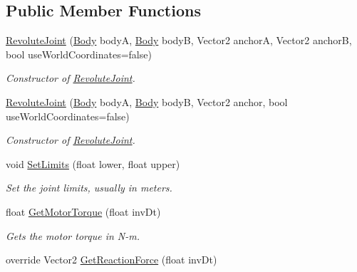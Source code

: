 \subsection*{Public Member Functions}
\begin{DoxyCompactItemize}
\item 
\hyperlink{class_farseer_physics_1_1_dynamics_1_1_joints_1_1_revolute_joint_a4f52ce45a6f14031f59de7c1bd7d6b66}{Revolute\+Joint} (\hyperlink{class_farseer_physics_1_1_dynamics_1_1_body}{Body} body\+A, \hyperlink{class_farseer_physics_1_1_dynamics_1_1_body}{Body} body\+B, Vector2 anchor\+A, Vector2 anchor\+B, bool use\+World\+Coordinates=false)
\begin{DoxyCompactList}\small\item\em Constructor of \hyperlink{class_farseer_physics_1_1_dynamics_1_1_joints_1_1_revolute_joint}{Revolute\+Joint}. \end{DoxyCompactList}\item 
\hyperlink{class_farseer_physics_1_1_dynamics_1_1_joints_1_1_revolute_joint_aa660255e4189a7669bf6d22c036af6f1}{Revolute\+Joint} (\hyperlink{class_farseer_physics_1_1_dynamics_1_1_body}{Body} body\+A, \hyperlink{class_farseer_physics_1_1_dynamics_1_1_body}{Body} body\+B, Vector2 anchor, bool use\+World\+Coordinates=false)
\begin{DoxyCompactList}\small\item\em Constructor of \hyperlink{class_farseer_physics_1_1_dynamics_1_1_joints_1_1_revolute_joint}{Revolute\+Joint}. \end{DoxyCompactList}\item 
void \hyperlink{class_farseer_physics_1_1_dynamics_1_1_joints_1_1_revolute_joint_ac8fd08ff0ee4da08b676504a0a2a665b}{Set\+Limits} (float lower, float upper)
\begin{DoxyCompactList}\small\item\em Set the joint limits, usually in meters. \end{DoxyCompactList}\item 
float \hyperlink{class_farseer_physics_1_1_dynamics_1_1_joints_1_1_revolute_joint_a86c56b109dae1a649e758f183095c7c0}{Get\+Motor\+Torque} (float inv\+Dt)
\begin{DoxyCompactList}\small\item\em Gets the motor torque in N-\/m. \end{DoxyCompactList}\item 
override Vector2 \hyperlink{class_farseer_physics_1_1_dynamics_1_1_joints_1_1_revolute_joint_a2be3ff931fd9507d2fa673fafda208b6}{Get\+Reaction\+Force} (float inv\+Dt)

\end{DoxyCompactItemize}
